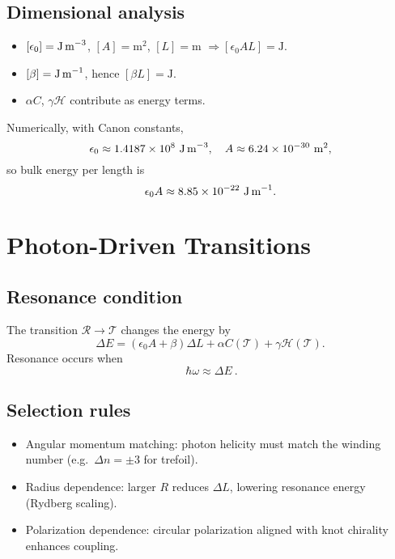 \documentclass[11pt,a4paper]{article}
\begin{document}
\subsection{Dimensional analysis}

\begin{itemize}
    \item $[\epsilon_0]=\text{J\,m}^{-3}$, $[A]=\text{m}^2$, $[L]=\text{m}$ $\Rightarrow [\epsilon_0 A L]=\text{J}$.
    \item $[\beta]=\text{J\,m}^{-1}$, hence $[\beta L]=\text{J}$.
    \item $\alpha C$, $\gamma \mathcal H$ contribute as energy terms.
\end{itemize}

Numerically, with Canon constants,
\begin{equation}
    \epsilon_0 \approx 1.4187\times10^{8}\ \text{J\,m}^{-3}, \quad
    A\approx 6.24\times10^{-30}\ \text{m}^2,
\end{equation}
so bulk energy per length is
\begin{equation}
    \epsilon_0 A \approx 8.85\times10^{-22}\ \text{J\,m}^{-1}.
\end{equation}

\section{Photon-Driven Transitions}

\subsection{Resonance condition}

The transition $\mathcal R\to \mathcal T$ changes the energy by
\begin{equation}
    \Delta E = (\epsilon_0 A + \beta)\Delta L + \alpha C(\mathcal T) + \gamma \mathcal H(\mathcal T).
\end{equation}
Resonance occurs when
\begin{equation}
    \boxed{\ \hbar \omega \approx \Delta E\ }.
\end{equation}

\subsection{Selection rules}

\begin{itemize}
    \item Angular momentum matching: photon helicity must match the winding number (e.g.\ $\Delta n=\pm 3$ for trefoil).
    \item Radius dependence: larger $R$ reduces $\Delta L$, lowering resonance energy (Rydberg scaling).
    \item Polarization dependence: circular polarization aligned with knot chirality enhances coupling.
\end{itemize}
\end{document}
